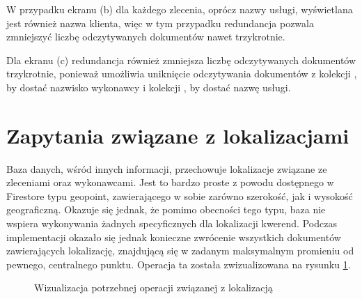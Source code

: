 W przypadku ekranu (b) dla każdego zlecenia, oprócz nazwy usługi, wyświetlana jest również nazwa klienta, więc w tym przypadku redundancja pozwala zmniejszyć liczbę odczytywanych dokumentów nawet trzykrotnie.

Dla ekranu (c) redundancja również zmniejsza liczbę odczytywanych dokumentów trzykrotnie, ponieważ umożliwia uniknięcie odczytywania dokumentów z kolekcji , by dostać nazwisko wykonawcy i kolekcji , by dostać nazwę usługi.


\section{Zapytania związane z lokalizacjami}

Baza danych, wśród innych informacji, przechowuje lokalizacje związane ze zleceniami oraz wykonawcami. Jest to bardzo proste z powodu dostępnego w Firestore typu geopoint, zawierającego w sobie zarówno szerokość, jak i wysokość geograficzną. Okazuje się jednak, że pomimo obecności tego typu, baza nie wspiera wykonywania żadnych specyficznych dla lokalizacji kwerend. 
Podczas implementacji okazało się jednak konieczne zwrócenie wszystkich dokumentów zawierających lokalizację, znajdującą się w zadanym maksymalnym promieniu od pewnego, centralnego punktu. Operacja ta została zwizualizowana na rysunku \ref{fig:query}.

\begin{figure}[ht]
  \centering
  \caption{Wizualizacja potrzebnej operacji związanej z lokalizacją}
  \label{fig:query}
\end{figure}

